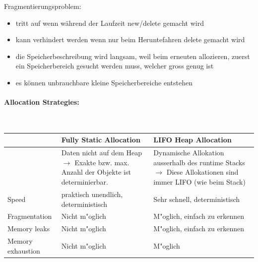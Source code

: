 \begin{tabular}{p{12cm}p{5cm}}
\end{tabular}

Fragmentierungsproblem:
\begin{itemize}
    \item tritt auf wenn während der Laufzeit new/delete gemacht wird
    \item kann verhindert werden wenn nur beim Heruntefahren delete gemacht wird
    \item die Speicherbeschreibung wird langsam, weil beim erneuten allozieren, zuerst ein Speicherbereich gesucht werden muss, welcher gross genug ist
    \item es können unbrauchbare kleine Speicherbereiche entstehen
\end{itemize}





\paragraph{Allocation Strategies: }~\\
\begin{tabular}{l||p{7cm}|p{7cm}|}
                        &  Fully Static Allocation & LIFO Heap Allocation\\
    \hline \hline
                        &   Daten nicht auf dem Heap $\rightarrow$ Exakte bzw. max. Anzahl der Objekte ist determinierbar. & Dynamische Allokation ausserhalb des runtime Stacks $\rightarrow$ Diese Allokationen sind immer LIFO (wie beim Stack)\\
    Speed               &   praktisch unendlich, deterministisch    & Sehr schnell, deterministisch \\
    Fragmentation       &   Nicht m"oglich                          & M"oglich, einfach zu erkennen\\
    Memory leaks        &   Nicht m"oglich                          & M"oglich, einfach zu erkennen\\
    Memory exhaustion   &   Nicht m"oglich                          & M"oglich\\



\end{tabular}


